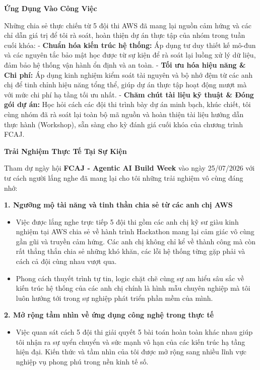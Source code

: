 \vspace{0.5em}\noindent\textbf{Ứng Dụng Vào Công Việc}

Những chia sẻ thực chiến từ 5 đội thi AWS đã mang lại nguồn cảm hứng và
các chỉ dẫn giá trị để tôi rà soát, hoàn thiện dự án thực tập của nhóm
trong tuần cuối khóa: - \textbf{Chuẩn hóa kiến trúc hệ thống:} Áp dụng
tư duy thiết kế mô-đun và các nguyên tắc bảo mật học được từ sự kiện để
rà soát lại luồng xử lý dữ liệu, đảm bảo hệ thống vận hành ổn định và an
toàn. - \textbf{Tối ưu hóa hiệu năng \& Chi phí:} Áp dụng kinh nghiệm
kiểm soát tài nguyên và bộ nhớ đệm từ các anh chị để tinh chỉnh hiệu
năng tổng thể, giúp dự án thực tập hoạt động mượt mà với mức chi phí hạ
tầng tối ưu nhất. - \textbf{Chăm chút tài liệu kỹ thuật \& Đóng gói dự
án:} Học hỏi cách các đội thi trình bày dự án minh bạch, khúc chiết, tôi
cùng nhóm đã rà soát lại toàn bộ mã nguồn và hoàn thiện tài liệu hướng
dẫn thực hành (Workshop), sẵn sàng cho kỳ đánh giá cuối khóa của chương
trình FCAJ.

\vspace{0.5em}\noindent\textbf{Trải Nghiệm Thực Tế Tại Sự Kiện}

Tham dự ngày hội \textbf{FCAJ - Agentic AI Build Week} vào ngày
25/07/2026 với tư cách người lắng nghe đã mang lại cho tôi những trải
nghiệm vô cùng đáng nhớ:

\vspace{0.5em}\noindent\textbf{1. Ngưỡng mộ tài năng và tinh thần chia sẻ từ các anh chị
AWS}

\begin{itemize}
\tightlist
\item
  Việc được lắng nghe trực tiếp 5 đội thi gồm các anh chị kỹ sư giàu
  kinh nghiệm tại AWS chia sẻ về hành trình Hackathon mang lại cảm giác
  vô cùng gần gũi và truyền cảm hứng. Các anh chị không chỉ kể về thành
  công mà còn rất thẳng thắn chia sẻ những khó khăn, các lỗi hệ thống
  từng gặp phải và cách cả đội cùng nhau vượt qua.
\item
  Phong cách thuyết trình tự tin, logic chặt chẽ cùng sự am hiểu sâu sắc
  về kiến trúc hệ thống của các anh chị chính là hình mẫu chuyên nghiệp
  mà tôi luôn hướng tới trong sự nghiệp phát triển phần mềm của mình.
\end{itemize}

\vspace{0.5em}\noindent\textbf{2. Mở rộng tầm nhìn về ứng dụng công nghệ trong thực tế}

\begin{itemize}
\tightlist
\item
  Việc quan sát cách 5 đội thi giải quyết 5 bài toán hoàn toàn khác nhau
  giúp tôi nhận ra sự uyển chuyển và sức mạnh vô hạn của các kiến trúc
  hạ tầng hiện đại. Kiến thức và tầm nhìn của tôi được mở rộng sang
  nhiều lĩnh vực nghiệp vụ phong phú trong nền kinh tế số.
\end{itemize}

